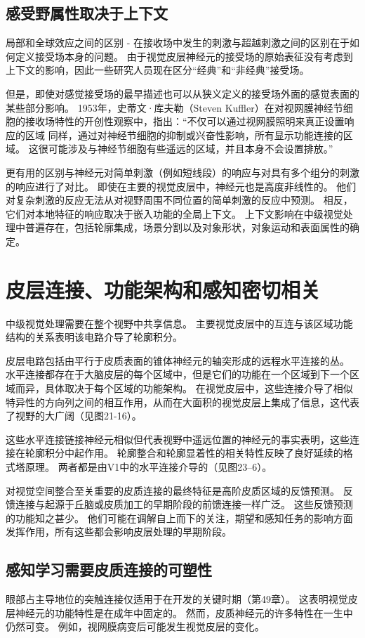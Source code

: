\subsection{感受野属性取决于上下文}

局部和全球效应之间的区别 - 在接收场中发生的刺激与超越刺激之间的区别在于如何定义接受场本身的问题。 由于视觉皮层神经元的接受场的原始表征没有考虑到上下文的影响，因此一些研究人员现在区分“经典”和“非经典”接受场。

但是，即使对感觉接受场的最早描述也可以从狭义定义的接受场外面的感觉表面的某些部分影响。 1953年，史蒂文·库夫勒（Steven Kuffler）在对视网膜神经节细胞的接收场特性的开创性观察中，指出：“不仅可以通过视网膜照明来真正设置响应的区域 同样，通过对神经节细胞的抑制或兴奋性影响，所有显示功能连接的区域。 这很可能涉及与神经节细胞有些遥远的区域，并且本身不会设置排放。”

更有用的区别与神经元对简单刺激（例如短线段）的响应与对具有多个组分的刺激的响应进行了对比。 即使在主要的视觉皮层中，神经元也是高度非线性的。 他们对复杂刺激的反应无法从对视野周围不同位置的简单刺激的反应中预测。 相反，它们对本地特征的响应取决于嵌入功能的全局上下文。 上下文影响在中级视觉处理中普遍存在，包括轮廓集成，场景分割以及对象形状，对象运动和表面属性的确定。


\section{皮层连接、功能架构和感知密切相关}
中级视觉处理需要在整个视野中共享信息。 主要视觉皮层中的互连与该区域功能结构的关系表明该电路介导了轮廓积分。

皮层电路包括由平行于皮质表面的锥体神经元的轴突形成的远程水平连接的丛。 水平连接都存在于大脑皮层的每个区域中，但是它们的功能在一个区域到下一个区域而异，具体取决于每个区域的功能架构。 在视觉皮层中，这些连接介导了相似特异性的方向列之间的相互作用，从而在大面积的视觉皮层上集成了信息，这代表了视野的大广阔（见图21-16）。

这些水平连接链接神经元相似但代表视野中遥远位置的神经元的事实表明，这些连接在轮廓积分中起作用。 轮廓整合和轮廓显着性的相关特性反映了良好延续的格式塔原理。 两者都是由V1中的水平连接介导的（见图23–6）。

对视觉空间整合至关重要的皮质连接的最终特征是高阶皮质区域的反馈预测。 反馈连接与起源于丘脑或皮质加工的早期阶段的前馈连接一样广泛。 这些反馈预测的功能知之甚少。 他们可能在调解自上而下的关注，期望和感知任务的影响方面发挥作用，所有这些都会影响皮层处理的早期阶段。

\subsection{感知学习需要皮质连接的可塑性}
眼部占主导地位的突触连接仅适用于在开发的关键时期（第49章）。 这表明视觉皮层神经元的功能特性是在成年中固定的。 然而，皮质神经元的许多特性在一生中仍然可变。 例如，视网膜病变后可能发生视觉皮层的变化。


